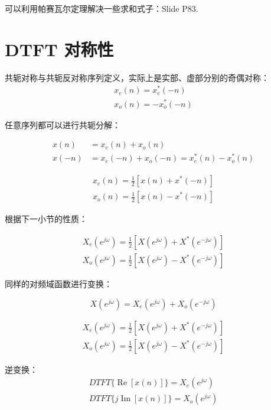 \documentclass[cn,11pt,chinese,black,simple]{elegantbook}
\begin{document}
可以利用帕赛瓦尔定理解决一些求和式子：Slide P83.



\section{DTFT 对称性}

共轭对称与共轭反对称序列定义，实际上是实部、虚部分别的奇偶对称： \[
    \begin{array}{l}
    x_{e}(n)=x_{e}^{*}(-n) \\
    x_{o}(n)=-x_{o}^{*}(-n)
    \end{array}
\]

任意序列都可以进行共轭分解：

\[\begin{aligned}
    x(n) &= x_e(n) + x_o(n) \\ 
    x(-n) &= x_e(-n) + x_o(-n) = x_e^*(n) - x_o^*(n) 
\end{aligned}\]

\[
\begin{array}{l}
x_{e}(n)=\frac{1}{2}\left[x(n)+x^{*}(-n)\right] \\
x_{o}(n)=\frac{1}{2}\left[x(n)-x^{*}(-n)\right]
\end{array}
\]

根据下一小节的性质：

\[
\begin{array}{l}
X_{e}\left(e^{j \omega}\right)=\frac{1}{2}\left[X\left(e^{j \omega}\right)+X^{*}\left(e^{-j \omega}\right)\right] \\
X_{o}\left(e^{j \omega}\right)=\frac{1}{2}\left[X\left(e^{j \omega}\right)-X^{*}\left(e^{-j \omega}\right)\right]
\end{array}
\]

同样的对频域函数进行变换：

\[X(e^{j\omega}) = X_e(e^{j\omega}) + X_o(e^{-j\omega})\] 

\[
\begin{array}{l}
X_{e}\left(e^{j \omega}\right)=\frac{1}{2}\left[X\left(e^{j \omega}\right)+X^{*}\left(e^{-j \omega}\right)\right] \\
X_{o}\left(e^{j \omega}\right)=\frac{1}{2}\left[X\left(e^{j \omega}\right)-X^{*}\left(e^{-j \omega}\right)\right]
\end{array}
\]

逆变换：
\[
\begin{array}{l}
D T F T\{\operatorname{Re}[x(n)]\}=X_{e}\left(e^{j \omega}\right) \\
D T F T\{j \operatorname{Im}[x(n)]\}=X_{o}\left(e^{j \omega}\right)
\end{array}
\]
\end{document}

